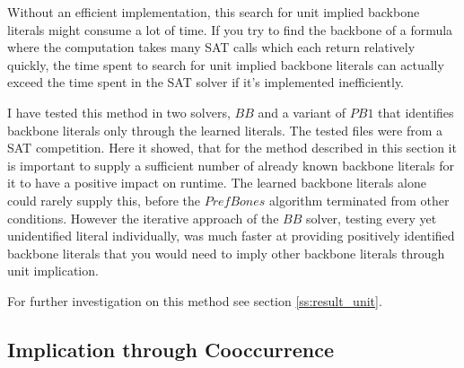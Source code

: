 \iffalse
fuer den fall dass platz generiert werden muss: den obigen algorithmus nochmal formell aufschreiben.
\begin{algorithm}
\caption{{\sc Iterative algorithm (two tests per variable)}}
\label{alg:iterTwo}
\DontPrintSemicolon
\KwIn{A satisfiable formula $F$ in CNF}
\KwOut{All literals of the backbone of $F$ $\nu_r$}


\Return{$\nu_r$}\;
\end{algorithm}
\fi

Without an efficient implementation, this search for unit implied backbone literals might consume a lot of time. If you try to find the backbone of a formula where the computation takes many SAT calls which each return relatively quickly, the time spent to search for unit implied backbone literals can actually exceed the time spent in the SAT solver if it's implemented inefficiently.

I have tested this method in two solvers, $BB$ and a variant of $PB1$ that identifies backbone literals only through the learned literals. The tested files were from a SAT competition. Here it showed, that for the method described in this section it is important to supply a sufficient number of already known backbone literals for it to have a positive impact on runtime. The learned backbone literals alone could rarely supply this, before the $PrefBones$ algorithm terminated from other conditions. However the iterative approach of the $BB$ solver, testing every yet unidentified literal individually, was much faster at providing positively identified backbone literals that you would need to imply other backbone literals through unit implication.


For further investigation on this method see section \ref{ss:result_unit}.






\subsection{Implication through Cooccurrence}
\label{subsec:coocc}

